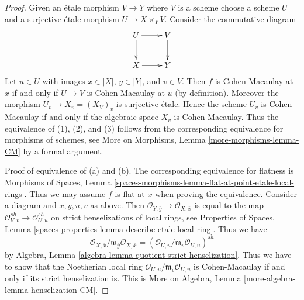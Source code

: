 \documentclass[10pt,a4paper]{amsart}
\theoremstyle{plain}
\theoremstyle{definition}
\theoremstyle{remark}
\numberwithin{equation}{subsection}
\begin{document}
\begin{proof}
Given an \'etale morphism $V \to Y$ where $V$ is a scheme
choose a scheme $U$ and a surjective \'etale morphism $U \to X \times_Y V$.
Consider the commutative diagram
$$
\xymatrix{
U \ar[d] \ar[r] & V \ar[d] \\
X \ar[r] & Y
}
$$
Let $u \in U$ with images $x \in |X|$, $y \in |Y|$, and $v \in V$.
Then $f$ is Cohen-Macaulay at $x$ if and only if $U \to V$ is
Cohen-Macaulay at $u$ (by definition). Moreover the morphism
$U_v \to X_v = (X_V)_v$ is surjective \'etale. Hence the scheme $U_v$ is
Cohen-Macaulay if and only if the algebraic space $X_v$ is Cohen-Macaulay.
Thus the equivalence of (1), (2), and (3) follows from the
corresponding equivalence for morphisms of
schemes, see More on Morphisms, Lemma \ref{more-morphisms-lemma-CM}
by a formal argument.

\medskip\noindent
Proof of equivalence of (a) and (b). The corresponding equivalence
for flatness is Morphisms of Spaces, Lemma
\ref{spaces-morphisms-lemma-flat-at-point-etale-local-rings}.
Thus we may assume $f$ is flat at $x$ when proving the equivalence.
Consider a diagram and $x, y, u, v$ as above. Then
$\mathcal{O}_{Y, \overline{y}} \to \mathcal{O}_{X, \overline{x}}$
is equal to the map
$\mathcal{O}_{V, v}^{sh} \to \mathcal{O}_{U, u}^{sh}$
on strict henselizations of local rings, see
Properties of Spaces, Lemma
\ref{spaces-properties-lemma-describe-etale-local-ring}.
Thus we have
$$
\mathcal{O}_{X, \overline{x}}/
\mathfrak m_{\overline{y}}\mathcal{O}_{X, \overline{x}} =
(\mathcal{O}_{U, u}/\mathfrak m_v \mathcal{O}_{U, u})^{sh}
$$
by Algebra, Lemma \ref{algebra-lemma-quotient-strict-henselization}.
Thus we have to show that the Noetherian local ring
$\mathcal{O}_{U, u}/\mathfrak m_v \mathcal{O}_{U, u}$
is Cohen-Macaulay if and only if its strict henselization is.
This is More on Algebra, Lemma \ref{more-algebra-lemma-henselization-CM}.
\end{proof}
\end{document}
